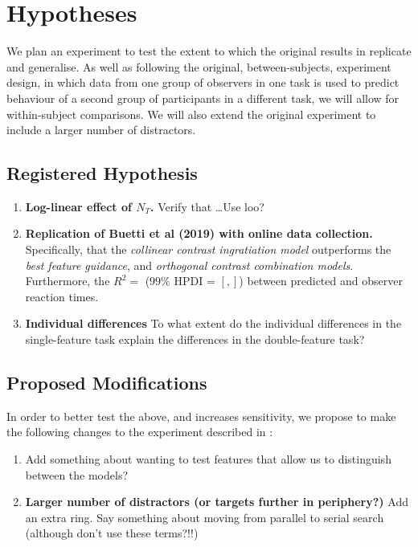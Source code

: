 \documentclass[smallextended, natbib]{svjour3}       %
\begin{document}
\section{Hypotheses}

We plan an experiment to test the extent to which the original results in \cite{buetti2019predicting} replicate and generalise. As well as following the original, between-subjects, experiment design, in which data from one group of observers in one task is used to predict behaviour of a second group of participants in a different task, we will allow for within-subject comparisons. We will also extend the original experiment to include a larger number of distractors. 

\subsection{Registered Hypothesis}

\begin{enumerate}
\item \textbf{Log-linear effect of $N_T$.} Verify that \ldots Use loo? \\
\item \textbf{Replication of Buetti et al (2019) with online data collection.} Specifically, that the \textit{collinear contrast ingratiation model} outperforms the \textit{best feature guidance}, and \textit{orthogonal contrast combination models}.  Furthermore, the $R^2 = $ ($99\%$ HPDI = $[, ]$) between predicted and observer reaction times.\\
 
\item \textbf{Individual differences} To what extent do the individual differences in the single-feature task explain the differences in the double-feature task?
\end{enumerate}

\subsection{Proposed Modifications}

In order to better test the above, and increases sensitivity, we propose to make the following changes to the experiment described in \cite{buetti2019predicting}:

\begin{enumerate}
\item Add something about wanting to test features that allow us to distinguish between the models?
\\
\item \textbf{Larger number of distractors (or targets further in periphery?)} Add an extra ring. Say something about moving from parallel to serial search (although don't use these terms?!!) \\ 
\end{enumerate}
\end{document}
